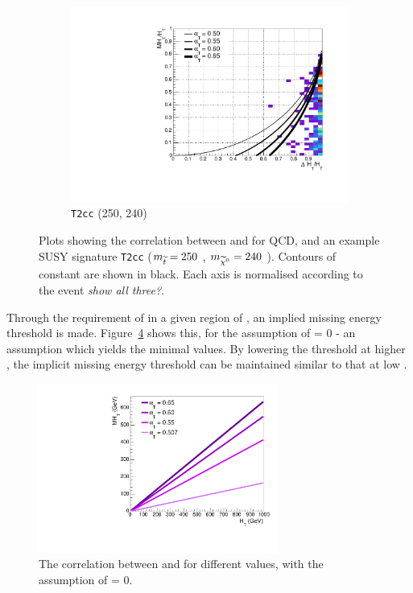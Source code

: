 \begin{figure}[h!]
\begin{subfigure}[b]{.46\textwidth}
    \caption{\zinv}
    \label{fig:alphat_corr_zinv}
  \end{subfigure}\\
  \begin{subfigure}[b]{.46\textwidth}
    \includegraphics[width=\textwidth]{Figs/alphat/alphat_correlation_T2cc_250_240.pdf}
    \caption{\texttt{T2cc} (250, 240)}
    \label{fig:alphat_corr_t2cc}
  \end{subfigure}
  \caption{Plots showing the correlation between \mht and \deltaHT for QCD,
  \zinv and an example SUSY signature \texttt{T2cc} ($m_{\widetilde{t}} = 250$ \gev,
  $m_{\widetilde{\chi}^{0}} = 240$ \gev). Contours of constant \alphat are shown in black.
  Each axis is normalised according to the event \HT \emph{show all three?}.}
  \label{fig:alphat_corr}
\end{figure}

Through the requirement of \alphat in a given region of \HT, an implied missing
energy threshold is made. Figure~\ref{fig:alphat_mht_corr} shows this, for the
assumption of \deltaHT = 0 - an assumption which yields the minimal \mht values.
By lowering the \alphat threshold at higher \HT, the implicit missing energy
threshold can be maintained similar to that at low \HT.

\begin{figure}
  \centering
  \includegraphics[width=0.7\textwidth]{Figs/alphat/mht_correlation.pdf}
  \caption{The correlation between \HT and \mht for different \alphat values,
  with the assumption of \deltaHT = 0.}
  \label{fig:alphat_mht_corr}
\end{figure}


